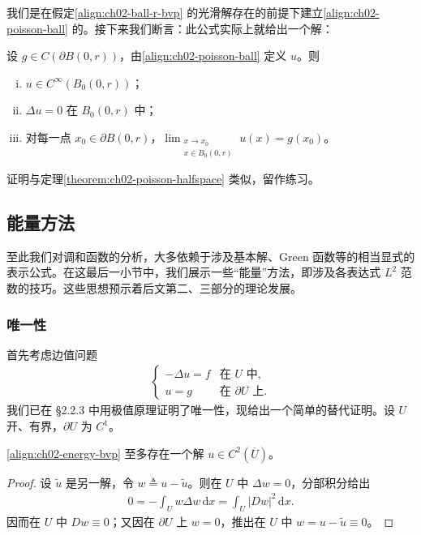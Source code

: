 \documentclass[../../main.tex]{subfiles}
\begin{document}
我们是在假定\eqref{align:ch02-ball-r-bvp} 的光滑解存在的前提下建立\eqref{align:ch02-poisson-ball} 的。接下来我们断言：此公式实际上就给出一个解：

\begin{theorem}[球的 Poisson 公式]\label{theorem:ch02-poisson-ball}设 $g\in C(\partial B(0,r))$，由\eqref{align:ch02-poisson-ball} 定义 $u$。则
\begin{enumerate}[(i)]
\item $u\in C^\infty(B_0(0,r))$；
\item $\Delta u=0$ 在 $B_0(0,r)$ 中；
\item 对每一点 $x_0\in\partial B(0,r)$，$\displaystyle\lim_{\substack{x\to x_0\\ x\in B_0(0,r)}}u(x)=g(x_0)$。
\end{enumerate}
\end{theorem}

证明与定理\cref{theorem:ch02-poisson-halfspace} 类似，留作练习。

\subsection{能量方法}\label{subsection:ch02-energy}

至此我们对调和函数的分析，大多依赖于涉及基本解、Green 函数等的相当显式的表示公式。在这最后一小节中，我们展示一些``能量''方法，即涉及各表达式 $L^2$ 范数的技巧。这些思想预示着后文第二、三部分的理论发展。

\subsubsection{唯一性}

首先考虑边值问题
\begin{align}\label{align:ch02-energy-bvp}
\begin{cases}
-\Delta u=f & \text{在 }U\text{ 中},\\
u=g & \text{在 }\partial U\text{ 上}.
\end{cases}
\end{align}
我们已在 \S2.2.3 中用极值原理证明了唯一性，现给出一个简单的替代证明。设 $U$ 开、有界，$\partial U$ 为 $C^1$。

\begin{theorem}[唯一性]\label{theorem:ch02-energy-uniqueness}\eqref{align:ch02-energy-bvp} 至多存在一个解 $u\in C^2(\overline{U})$。
\end{theorem}

\begin{proof}
设 $\widetilde{u}$ 是另一解，令 $w\triangleq u-\widetilde{u}$。则在 $U$ 中 $\Delta w=0$，分部积分给出
\begin{align*}
0=-\int_U w\Delta w\,\mathrm{d}x=\int_U|Dw|^2\,\mathrm{d}x.
\end{align*}
因而在 $U$ 中 $Dw\equiv 0$；又因在 $\partial U$ 上 $w=0$，推出在 $U$ 中 $w=u-\widetilde{u}\equiv 0$。
\end{proof}
\end{document}
